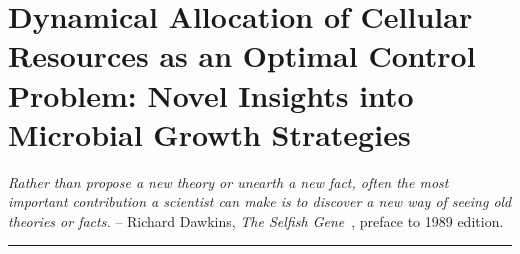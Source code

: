 \chapter{Dynamical Allocation of Cellular Resources as an Optimal Control Problem: Novel Insights into Microbial Growth Strategies}
\label{chap:theory}

\textit{Rather than propose a new theory or unearth a new fact, often the most important contribution a scientist can make is to discover a new way of seeing old theories or facts.} -- Richard Dawkins, \textit{The Selfish Gene}~\cite{dawkins_selfish_1976}, preface to 1989 edition.

\begin{center}
\noindent\rule{4cm}{0.1pt}
\end{center}

